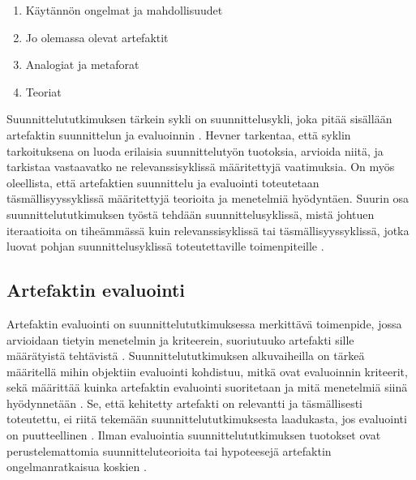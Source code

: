 \documentclass[utf8]{gradu3}
\begin{document}
\begin{enumerate}
  \item Käytännön ongelmat ja mahdollisuudet
  \item Jo olemassa olevat artefaktit
  \item Analogiat ja metaforat
  \item Teoriat
\end{enumerate}

Suunnittelututkimuksen tärkein sykli on suunnittelusykli, joka pitää sisällään artefaktin suunnittelun ja evaluoinnin \parencite{cycles}. Hevner \parencite*{cycles} tarkentaa, että syklin tarkoituksena on luoda erilaisia suunnittelutyön tuotoksia, arvioida niitä, ja tarkistaa vastaavatko ne relevanssisyklissä määritettyjä vaatimuksia. On myös oleellista, että artefaktien suunnittelu ja evaluointi toteutetaan täsmällisyyssyklissä määritettyjä teorioita ja menetelmiä hyödyntäen. Suurin osa suunnittelututkimuksen työstä tehdään suunnittelusyklissä, mistä johtuen iteraatioita on tiheämmässä kuin relevanssisyklissä tai täsmällisyyssyklissä, jotka luovat pohjan suunnittelusyklissä toteutettaville toimenpiteille \parencite{cycles}.

\subsection{Artefaktin evaluointi}
\label{kriteerit}

Artefaktin evaluointi on suunnittelututkimuksessa merkittävä toimenpide, jossa arvioidaan tietyin menetelmin ja kriteerein, suoriutuuko artefakti sille määrätyistä tehtävistä \parencite{smith}. Suunnittelututkimuksen alkuvaiheilla on tärkeä määritellä mihin objektiin evaluointi kohdistuu, mitkä ovat evaluoinnin kriteerit, sekä määrittää kuinka artefaktin evaluointi suoritetaan ja mitä menetelmiä siinä hyödynnetään \parencite{evaluation}. Se, että kehitetty artefakti on relevantti ja täsmällisesti toteutettu, ei riitä tekemään suunnittelututkimuksesta laadukasta, jos evaluointi on puutteellinen \parencite{cycles}. Ilman evaluointia suunnittelututkimuksen tuotokset ovat perustelemattomia suunnitteluteorioita tai hypoteesejä artefaktin ongelmanratkaisua koskien \parencite{comprehensive}. 
\end{document}

